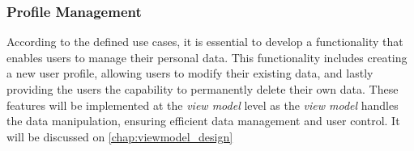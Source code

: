 \subsubsection{Profile Management}
According to the defined use cases, it is essential to develop a functionality that enables users to manage their personal data. This functionality includes creating a new user profile, allowing users to modify their existing data, and lastly providing the users the capability to permanently delete their own data. These features will be implemented at the \emph{view model} level as the \emph{view model} handles the data manipulation, ensuring efficient data management and user control.
It will be discussed on \autoref{chap:viewmodel_design}



